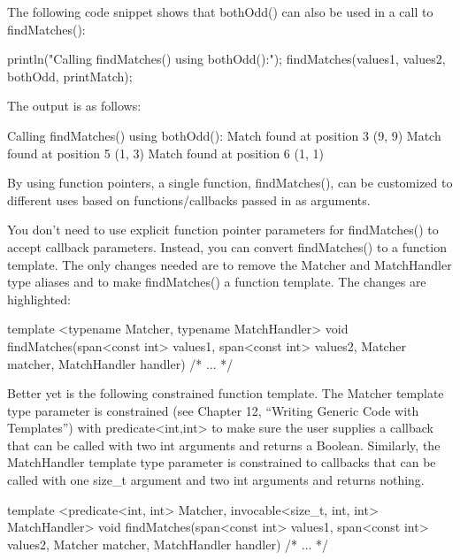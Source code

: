 
The following code snippet shows that bothOdd() can also be used in a call to findMatches():

\begin{cpp}
println("Calling findMatches() using bothOdd():");
findMatches(values1, values2, bothOdd, printMatch);
\end{cpp}

The output is as follows:

\begin{shell}
Calling findMatches() using bothOdd():
Match found at position 3 (9, 9)
Match found at position 5 (1, 3)
Match found at position 6 (1, 1)
\end{shell}

By using function pointers, a single function, findMatches(), can be customized to different uses based on functions/callbacks passed in as arguments.


You don’t need to use explicit function pointer parameters for findMatches() to accept callback parameters. Instead, you can convert findMatches() to a function template. The only changes needed are to remove the Matcher and MatchHandler type aliases and to make findMatches() a function template. The changes are highlighted:

\begin{cpp}
template <typename Matcher, typename MatchHandler>
void findMatches(span<const int> values1, span<const int> values2,
    Matcher matcher, MatchHandler handler)
{ /* ... */ }
\end{cpp}

Better yet is the following constrained function template. The Matcher template type parameter is constrained (see Chapter 12, “Writing Generic Code with Templates”) with predicate<int,int> to make sure the user supplies a callback that can be called with two int arguments and returns a Boolean. Similarly, the MatchHandler template type parameter is constrained to callbacks that can be called with one size\_t argument and two int arguments and returns nothing.

\begin{cpp}
template <predicate<int, int> Matcher, invocable<size_t, int, int> MatchHandler>
void findMatches(span<const int> values1, span<const int> values2,
    Matcher matcher, MatchHandler handler)
{ /* ... */ }
\end{cpp}


